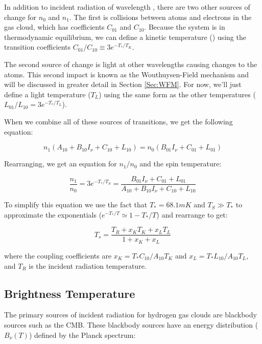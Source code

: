 
In addition to incident radiation of wavelength \cm, there are two other sources of change for $n_0$ and $n_1$. The first is collisions between atoms and electrons in the gas cloud, which has coefficients $C_{01}$ and $C_{10}$. Because the system is in thermodynamic equilibrium, we can define a kinetic temperature (\tk) using the transition coefficients $C_{01}/C_{10} \equiv 3 e^{-T_*/T_K}$. 

The second source of change is light at other wavelengths causing changes to the atoms. This second impact is known as the Wouthuysen-Field mechanism \cite{wouthuysen_1952}\cite{field_1958} and will be discussed in greater detail in Section \ref{Sec:WFM}. For now, we'll just define a light temperature ($T_L$) using the same form as the other temperatures ($L_{01}/L_{10} = 3 e^{-T_*/T_L}$).

When we combine all of these sources of transitions, we get the following equation: 

\begin{equation}
n_1(A_{10} + B_{10} I_\nu + C_{10} + L_{10}) = n_0 (B_{01} I_\nu + C_{01} + L_{01})
\end{equation}

Rearranging, we get an equation for $n_1 / n_0$ and the spin temperature:

\begin{equation}
\frac{n_1}{n_0} = 3 e^{-T_*/T_S} = \frac{B_{01} I_\nu + C_{01}+ L_{01}}{A_{10}+ B_{10} I_\nu + C_{10} +L_{10}}
\end{equation}

To simplify this equation we use the fact that $T_* = 68.1 mK$ and $T_S \gg T_*$ to approximate the exponentials ($e^{-T_*/T} \simeq 1-T_*/T$) and rearrange to get:

\begin{equation}\label{Eq:dT_s}
T_s = \frac{T_{R} + x_K T_{K} + x_{L} T_{L}}{1+x_K +x_{L}}
\end{equation}

where the coupling coefficients are $x_K = T_* C_{10}/A_{10} T_K$ and $x_L = T_* L_{10} / A_{10} T_L$, and $T_R$ is the incident radiation temperature. 

\subsection{Brightness Temperature}
The primary sources of incident radiation for hydrogen gas clouds are blackbody sources such as the CMB.  These blackbody sources have an energy distribution ($B_\nu (T)$) defined by the Planck spectrum:


